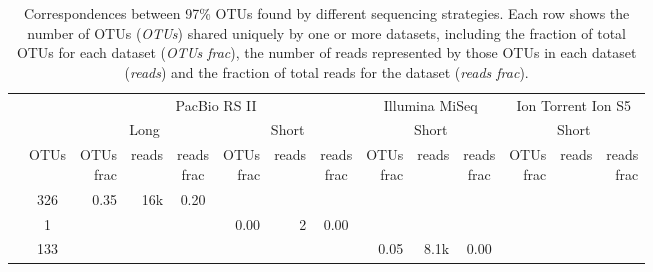 \documentclass[
]{article}
\begin{document}
\begin{table}

\caption[Correspondences between 97\% OTUs found by different sequencing strategies]{\label{tab:venn-table-otu}Correspondences between 97\% OTUs found by different sequencing strategies. Each row shows the number of OTUs (\emph{OTUs}) shared uniquely by one or more datasets, including the fraction of total OTUs for each dataset (\emph{OTUs frac}), the number of reads represented by those OTUs in each dataset (\emph{reads}) and the fraction of total reads for the dataset (\emph{reads frac}).}
\centering
\begin{tabular}[t]{rcrrcrrcrrcrrr}
\toprule
\multicolumn{2}{c}{ } & \multicolumn{6}{c}{PacBio RS II} & \multicolumn{3}{c}{Illumina MiSeq} & \multicolumn{3}{c}{Ion Torrent Ion S5} \\
\cmidrule(l{3pt}r{3pt}){3-8} \cmidrule(l{3pt}r{3pt}){9-11} \cmidrule(l{3pt}r{3pt}){12-14}
\multicolumn{2}{c}{ } & \multicolumn{3}{c}{Long} & \multicolumn{3}{c}{Short} & \multicolumn{3}{c}{Short} & \multicolumn{3}{c}{Short} \\
\cmidrule(l{3pt}r{3pt}){3-5} \cmidrule(l{3pt}r{3pt}){6-8} \cmidrule(l{3pt}r{3pt}){9-11} \cmidrule(l{3pt}r{3pt}){12-14}
\makecell[c]{\\} & OTUs & \makecell[c]{OTUs\\frac} & reads & \makecell[c]{reads\\frac} & \makecell[c]{OTUs\\frac} & reads & \makecell[c]{reads\\frac} & \makecell[c]{OTUs\\frac} & reads & \makecell[c]{reads\\frac} & \makecell[c]{OTUs\\frac} & reads & \makecell[c]{reads\\frac}\\
\midrule
 & 326 & 0.35 & 16k & 0.20 & \cellcolor{gray}{  } & \cellcolor{gray}{  } & \cellcolor{gray}{  } & \cellcolor{gray}{  } & \cellcolor{gray}{  } & \cellcolor{gray}{  } & \cellcolor{gray}{  } & \cellcolor{gray}{  } & \cellcolor{gray}{  }\\
 & 1 & \cellcolor{gray}{  } & \cellcolor{gray}{  } & \cellcolor{gray}{  } & 0.00 & 2 & 0.00 & \cellcolor{gray}{  } & \cellcolor{gray}{  } & \cellcolor{gray}{  } & \cellcolor{gray}{  } & \cellcolor{gray}{  } & \cellcolor{gray}{  }\\
 & 133 & \cellcolor{gray}{  } & \cellcolor{gray}{  } & \cellcolor{gray}{  } & \cellcolor{gray}{  } & \cellcolor{gray}{  } & \cellcolor{gray}{  } & 0.05 & 8.1k & 0.00 & \cellcolor{gray}{  } & \cellcolor{gray}{  } & \cellcolor{gray}{  }\\

\end{tabular}
\end{table}
\end{document}
